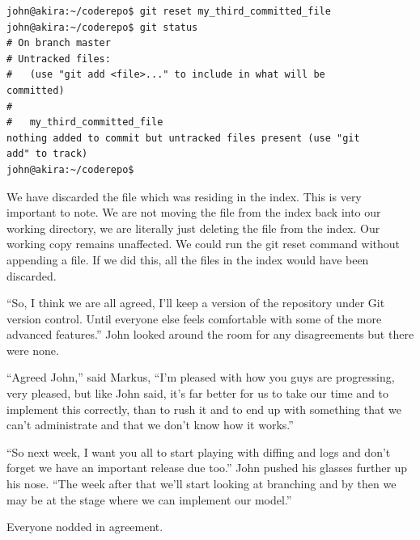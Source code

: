 \begin{Verbatim}[frame=leftline,framerule=1mm,fontsize=\relsize{-3}] 
john@akira:~/coderepo$ git reset my_third_committed_file
john@akira:~/coderepo$ git status
# On branch master
# Untracked files:
#   (use "git add <file>..." to include in what will be 
committed)
#
#	my_third_committed_file
nothing added to commit but untracked files present (use "git 
add" to track)
john@akira:~/coderepo$ 
\end{Verbatim}

We have discarded the file which was residing in the index.  This is very important to note.  We are not moving the file from the index back into our working directory, we are literally just deleting the file from the index.  Our working copy remains unaffected.  We could run the git reset command without appending a file.  If we did this, all the files in the index would have been discarded.  

\begin{trenches}
``So, I think we are all agreed, I'll keep a version of the repository under Git version control.  Until everyone else feels comfortable with some of the more advanced features.''  John looked around the room for any disagreements but there were none.

``Agreed John,'' said Markus, ``I'm pleased with how you guys are progressing, very pleased, but like John said, it's far better for us to take our time and to implement this correctly, than to rush it and to end up with something that we can't administrate and that we don't know how it works.''

``So next week, I want you all to start playing with diffing and logs and don't forget we have an important release due too.''  John pushed his glasses further up his nose.  ``The week after that we'll start looking at branching and by then we may be at the stage where we can implement our model.''

Everyone nodded in agreement.
\end{trenches}

